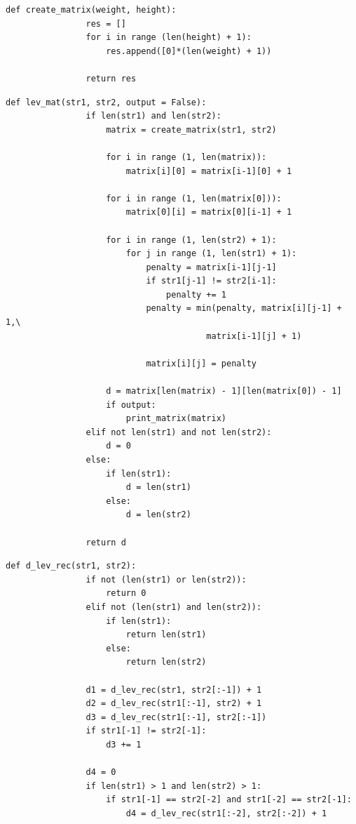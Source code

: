 \documentclass[a4paper,12pt]{report}
\begin{document}
\begin{center}
\begin{flushleft}
\begin{lstlisting}[frame = single, breaklines, caption = Листинг вспомогательных функций и объявлений]
	        def create_matrix(weight, height):
	        	res = []
	        	for i in range (len(height) + 1):
	        		res.append([0]*(len(weight) + 1))
	        
	        	return res 
	        \end{lstlisting}
	        
	        \begin{lstlisting}[frame = single, breaklines, caption = Листинг матричного алгоритма расстояния Левенштейна]
	        def lev_mat(str1, str2, output = False):
	        	if len(str1) and len(str2):
	        		matrix = create_matrix(str1, str2)
	        
	        		for i in range (1, len(matrix)):
	        			matrix[i][0] = matrix[i-1][0] + 1
	        
	        		for i in range (1, len(matrix[0])):
	        			matrix[0][i] = matrix[0][i-1] + 1
	        
	        		for i in range (1, len(str2) + 1):
	        			for j in range (1, len(str1) + 1):
	        				penalty = matrix[i-1][j-1]
	        				if str1[j-1] != str2[i-1]:
	        					penalty += 1
	        				penalty = min(penalty, matrix[i][j-1] + 1,\ 
	        							matrix[i-1][j] + 1)
	        
	        				matrix[i][j] = penalty
	        
	        		d = matrix[len(matrix) - 1][len(matrix[0]) - 1]
	        		if output:
	        			print_matrix(matrix)
	        	elif not len(str1) and not len(str2):
	        		d = 0
	        	else:
	        		if len(str1):
	        			d = len(str1)
	        		else:
	        			d = len(str2)
	        
	        	return d
	        \end{lstlisting}
	        	
	        \begin{lstlisting}[frame = single, breaklines, caption = Листинг рекурсивного алгоритма расстояния Дамерау-Левенштейна]
	        def d_lev_rec(str1, str2):
	        	if not (len(str1) or len(str2)):
	        		return 0
	        	elif not (len(str1) and len(str2)):
	        		if len(str1):
	        			return len(str1)
	        		else:
	        			return len(str2)
	        
	        	d1 = d_lev_rec(str1, str2[:-1]) + 1
	        	d2 = d_lev_rec(str1[:-1], str2) + 1
	        	d3 = d_lev_rec(str1[:-1], str2[:-1])
	        	if str1[-1] != str2[-1]:
	        		d3 += 1
	        
	        	d4 = 0
	        	if len(str1) > 1 and len(str2) > 1:
	        		if str1[-1] == str2[-2] and str1[-2] == str2[-1]:
	        			d4 = d_lev_rec(str1[:-2], str2[:-2]) + 1
	        

\end{lstlisting}
\end{flushleft}
\end{center}
\end{document}
